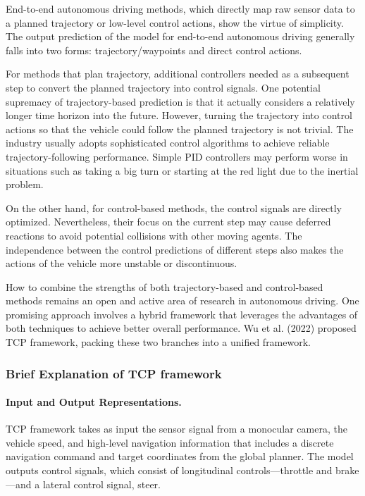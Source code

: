 End-to-end autonomous driving methods, which directly map raw sensor data to a planned trajectory
or low-level control actions, show the virtue of simplicity. The output prediction of the model for end-to-end autonomous driving generally falls into two forms: trajectory/waypoints and direct control actions. 

For methods that plan trajectory, additional controllers needed as a subsequent step to convert the planned trajectory into control signals. One potential supremacy of trajectory-based prediction is that it actually considers a relatively longer time horizon into the future. However, turning the trajectory into control actions so that the vehicle could follow the planned trajectory is not trivial. The industry usually adopts sophisticated control algorithms to achieve reliable trajectory-following performance. Simple PID controllers may perform worse in situations such as taking a big turn or starting at the red light due to the inertial problem. 

On the other hand, for control-based methods, the control signals are directly optimized. Nevertheless, their focus on the current step may cause deferred reactions to avoid potential collisions with other moving agents. The independence between the control predictions of different steps also makes the actions of the vehicle more unstable or discontinuous.

How to combine the strengths of both trajectory-based and control-based methods remains an open and active area of research in autonomous driving. One promising approach involves a hybrid framework that leverages the advantages of both techniques to achieve better overall performance. Wu et al. (2022) proposed TCP \cite{wu2022trajectory} framework, packing these two branches into a unified framework.

\subsubsection{Brief Explanation of TCP framework}

\paragraph{Input and Output Representations.} TCP framework takes as input the sensor signal from a monocular camera, the vehicle speed, and high-level navigation information that includes a discrete navigation command and target coordinates from the global planner. The model outputs control signals, which consist of longitudinal controls---throttle and brake---and a lateral control signal, steer.

